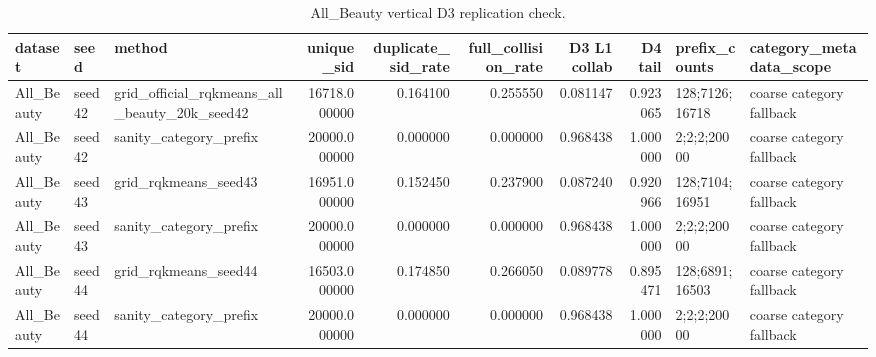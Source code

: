 \begin{table}
\caption{All_Beauty vertical D3 replication check.}
\label{tab:all-beauty-d3}
\begin{tabular}{lllrrrrrll}
\toprule
dataset & seed & method & unique\_sid & duplicate\_sid\_rate & full\_collision\_rate & D3 L1 collab & D4 tail & prefix\_counts & category\_metadata\_scope \\
\midrule
All\_Beauty & seed42 & grid\_official\_rqkmeans\_all\_beauty\_20k\_seed42 & 16718.000000 & 0.164100 & 0.255550 & 0.081147 & 0.923065 & 128;7126;16718 & coarse category fallback \\
All\_Beauty & seed42 & sanity\_category\_prefix & 20000.000000 & 0.000000 & 0.000000 & 0.968438 & 1.000000 & 2;2;2;20000 & coarse category fallback \\
All\_Beauty & seed43 & grid\_rqkmeans\_seed43 & 16951.000000 & 0.152450 & 0.237900 & 0.087240 & 0.920966 & 128;7104;16951 & coarse category fallback \\
All\_Beauty & seed43 & sanity\_category\_prefix & 20000.000000 & 0.000000 & 0.000000 & 0.968438 & 1.000000 & 2;2;2;20000 & coarse category fallback \\
All\_Beauty & seed44 & grid\_rqkmeans\_seed44 & 16503.000000 & 0.174850 & 0.266050 & 0.089778 & 0.895471 & 128;6891;16503 & coarse category fallback \\
All\_Beauty & seed44 & sanity\_category\_prefix & 20000.000000 & 0.000000 & 0.000000 & 0.968438 & 1.000000 & 2;2;2;20000 & coarse category fallback \\
\bottomrule
\end{tabular}
\end{table}

